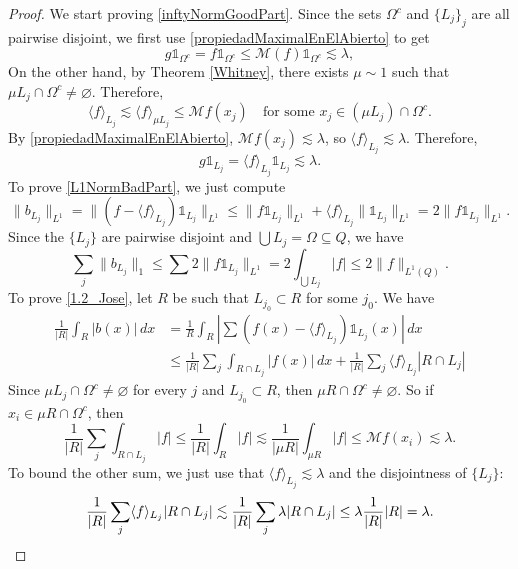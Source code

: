 \documentclass[12pt]{amsart}
\newcommand{\one}{\mathds{1}}
\theoremstyle{plain}
\theoremstyle{definition} %
\numberwithin{equation}{section}
\begin{document}
\begin{proof}
We start proving \eqref{inftyNormGoodPart}. Since the sets $\Omega^{c}$ and $\{L_j\}_j$ are all pairwise disjoint, we first use \eqref{propiedadMaximalEnElAbierto} to get
\[
g\one_{\Omega^c}
=
f\one_{\Omega^c}
\leq
\mathcal{M}(f)\one_{\Omega^c}
\lesssim
\lambda,
\]
On the other hand, by Theorem \ref{Whitney}, there exists $\mu\sim 1$ such that $\mu L_j\cap \Omega^{c}\neq\varnothing$. Therefore, 
    \[
    \langle f\rangle_{L_j}
    \lesssim 
    \langle f\rangle_{\mu L_j}
    \leq 
    \mathcal{M}f(x_j)\quad \text{for some }x_j\in (\mu L_j)\cap\Omega^{c}.
    \]
By \eqref{propiedadMaximalEnElAbierto}, $\mathcal{M}f(x_j)\lesssim \lambda$, so $\langle f\rangle_{L_j}\lesssim \lambda$. Therefore, 
\[
g\one_{L_j}
=
\langle f\rangle_{L_j}\one_{L_j}
\lesssim 
\lambda.
\]
To prove \eqref{L1NormBadPart}, we just compute
\[
\|b_{L_j}\|_{L^1}
=
\|(f-\langle f\rangle_{L_j})\one_{L_j}\|_{L^1}
\leq 
\|f\one_{L_j}\|_{L^1}
+
\langle f\rangle_{L_j}\|\one_{L_j}\|_{L^1}
=
2\|f\one_{L_j}\|_{L^1}.
\]
Since the $\{L_j\}$ are pairwise disjoint and $\bigcup L_j=\Omega\subseteq Q$, we have
\[
\sum_j \|b_{L_j}\|_{1}
\leq 
\sum 2\|f\one_{L_j}\|_{L^1}
=
2\int_{\bigcup L_j} |f|
\leq
2\|f\|_{L^1(Q)}.
\]
To prove \eqref{1.2_Jose}, let $R$ be such that $L_{j_0}\subset R$ for some $j_0$. We have
\begin{align*}
    \frac{1}{|R|}\int_{R}|b(x)|\, dx
    &=
    \frac{1}{R}\int_{R}\left|\sum (f(x)-\langle f\rangle_{L_j})\one_{L_j}(x)\right|\, dx
    \\&\leq 
    \frac{1}{|R|}\sum_{j}
    \int_{R\cap L_j}|f(x)|\, dx
    +
    \frac{1}{|R|}\sum_{j}\langle f\rangle_{L_j}|R\cap L_j|
\end{align*}
Since $\mu L_{j}\cap \Omega^{c}\neq\varnothing$ for every $j$ and $L_{j_0}\subset R$, then $\mu R\cap \Omega^{c}\neq \varnothing$. So if $x_i\in \mu R\cap\Omega^{c}$, then %
\[
\frac{1}{|R|}\sum_{j}\int_{R\cap L_j}|f|
\leq%
\frac{1}{|R|}\int_{R}|f|
\lesssim 
\frac{1}{|\mu R|}\int_{\mu R}|f|
\leq 
\mathcal{M}f(x_i)
\lesssim
\lambda.
\]
To bound the other sum, we just use that $\langle f\rangle_{L_j}\lesssim \lambda$ and the disjointness of $\{L_j\}$:
\[
\frac{1}{|R|}\sum_{j}\langle f\rangle_{L_{j}}|R\cap L_{j}|
\lesssim 
\frac{1}{|R|}\sum_{j}\lambda|R\cap L_{j}|
\leq  %
\lambda\frac{1}{|R|}|R|
=
\lambda.    \qedhere
\]
\end{proof}
\end{document}
